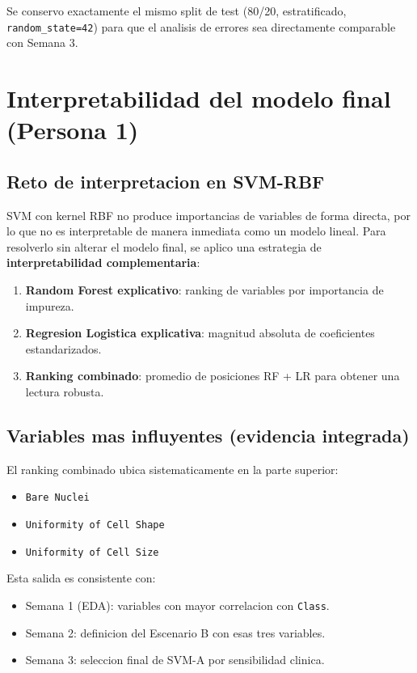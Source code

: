 \documentclass[11pt,a4paper]{article}
\begin{document}
Se conservo exactamente el mismo split de test (80/20, estratificado, \texttt{random\_state=42}) para que el analisis de errores sea directamente comparable con Semana 3.

\section{Interpretabilidad del modelo final (Persona 1)}

\subsection{Reto de interpretacion en SVM-RBF}

SVM con kernel RBF no produce importancias de variables de forma directa, por lo que no es interpretable de manera inmediata como un modelo lineal. Para resolverlo sin alterar el modelo final, se aplico una estrategia de \textbf{interpretabilidad complementaria}:

\begin{enumerate}[leftmargin=1.2cm]
\item \textbf{Random Forest explicativo}: ranking de variables por importancia de impureza.
\item \textbf{Regresion Logistica explicativa}: magnitud absoluta de coeficientes estandarizados.
\item \textbf{Ranking combinado}: promedio de posiciones RF + LR para obtener una lectura robusta.
\end{enumerate}

\subsection{Variables mas influyentes (evidencia integrada)}

El ranking combinado ubica sistematicamente en la parte superior:

\begin{itemize}[leftmargin=1.2cm]
\item \texttt{Bare Nuclei}
\item \texttt{Uniformity of Cell Shape}
\item \texttt{Uniformity of Cell Size}
\end{itemize}

Esta salida es consistente con:

\begin{itemize}[leftmargin=1.2cm]
\item Semana 1 (EDA): variables con mayor correlacion con \texttt{Class}.
\item Semana 2: definicion del Escenario B con esas tres variables.
\item Semana 3: seleccion final de SVM-A por sensibilidad clinica.
\end{itemize}
\end{document}
